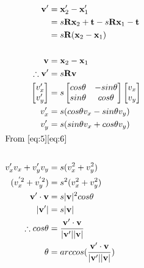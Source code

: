 \documentclass[letterpaper, 11pt]{article}
\begin{document}
\begin{align}
    \textbf{v}'                & = \textbf{x}'_2 - \textbf{x}'_1\nonumber                                \\
                               & = {s}\textbf{R}\textbf{x}_2 + \textbf{t} -
    {s}\textbf{R}\textbf{x}_1 - \textbf{t}\nonumber                                                      \\
                               & ={s}\textbf{R}(\textbf{x}_2-\textbf{x}_1)                               \\
    \nonumber                                                                                            \\
    \textbf{v}                 & = \textbf{x}_2 - \textbf{x}_1                                           \\
    \therefore \textbf{v}'     & = s\textbf{R}\textbf{v}                                                 \\
    \begin{bmatrix}
        v'_x \\
        v'_y
    \end{bmatrix}
                               & =
    s
    \begin{bmatrix}
        cos\theta & -sin\theta \\
        sin\theta & cos\theta
    \end{bmatrix}
    \begin{bmatrix}
        v_x \\
        v_y
    \end{bmatrix}\nonumber                                                                               \\
    v'_x                       & =s(cos\theta v_x - sin\theta v_y)\label{eq:5}                           \\
    v'_y                       & =s(sin\theta v_x + cos\theta v_y)    \label{eq:6}                       \\
    \intertext{From \eqref{eq:5}\eqref{eq:6}}\nonumber                                                   \\
    v'_x v_x + v'_y v_y        & = s(v_x^2+v_y^2)                                                        \\
    (v_x^{'2}+v_y^{'2})        & =s^2(v_x^2+v_y^2)                                                       \\
    \textbf{v}'\cdot\textbf{v} & = s |\textbf{v}|^2 cos\theta                                            \\
    |\textbf{v}'|              & =s|\textbf{v}|\label{eq:10}                                             \\
    \therefore cos\theta       & = \frac{\textbf{v}'\cdot\textbf{v}}{|\textbf{v}'||\textbf{v}|}\nonumber \\
    \theta                     & = arccos(\frac{\textbf{v}'\cdot\textbf{v}}{|\textbf{v}'||\textbf{v}|})
\end{align}
\end{document}
